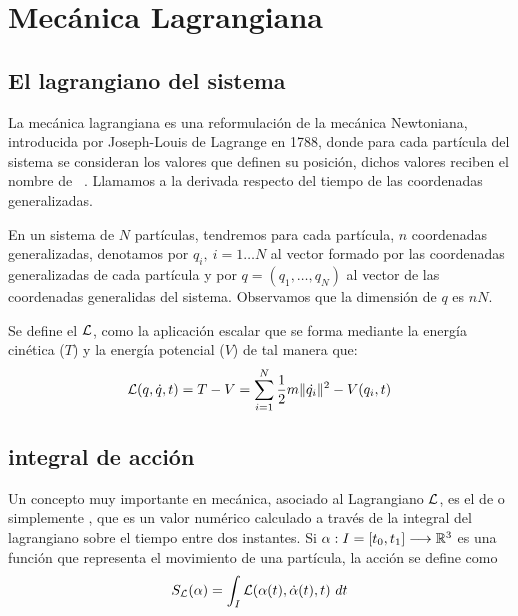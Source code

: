 \chapter{Mecánica Lagrangiana}\label{ch:mecanica-lagrangiana}

\section{El lagrangiano del sistema}\label{sec:el-lagrangiano-del-sistema}

La mecánica lagrangiana es una reformulación de la mecánica Newtoniana, introducida por Joseph-Louis de Lagrange en 1788, donde para cada partícula del sistema se consideran los valores que definen su posición, dichos valores reciben el nombre de ~\autocite{GTP}.
Llamamos  a la derivada respecto del tiempo de las coordenadas generalizadas.

En un sistema de $N$ partículas, tendremos para cada partícula, $n$ coordenadas generalizadas, denotamos por $q_i,\ i=1\dots N$ al vector formado por las coordenadas generalizadas de cada partícula y por $q=(q_1,\dots,q_N)$ al vector de las coordenadas generalidas del sistema.
Observamos que la dimensión de $q$ es $nN$.

Se define el  $\mathcal{L}$, como la aplicación escalar que se forma mediante la energía cinética ($T$) y la energía potencial ($V$) de tal manera que:
\begin{equation}
	\label{eq:lagrangiano_clasico}
	\mathcal{L}(q,\dot{q},t)=T-V=\sum\limits_{i=1}^{N} \frac{1}{2}m\|\dot{q_i}\|^2-V(q_i,t)
\end{equation}

\section{integral de acción}\label{sec:integral-de-accion}

Un concepto muy importante en mecánica, asociado al Lagrangiano $\mathcal{L}$, es el de  o simplemente , que es un valor numérico calculado a través de la integral del lagrangiano sobre el tiempo entre dos instantes.
Si $\alpha:I=[t_0, t_1]\longrightarrow \mathbb{R}^3$ es una función que representa el movimiento de una partícula, la acción se define como
\begin{equation}
	\label{eq:accion}
	S_{\mathcal{L}}(\alpha) = \int_{I}\mathcal{L}(\alpha(t), \dot{\alpha}(t), t)\ dt
\end{equation}

